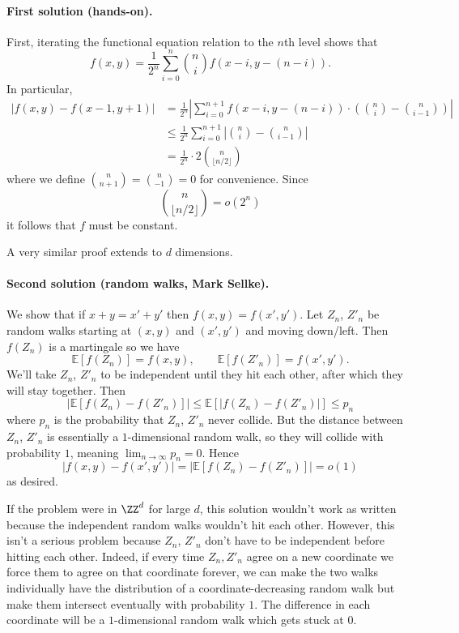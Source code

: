 \documentclass[11pt]{scrartcl}
\begin{document}
\paragraph{First solution (hands-on).}
First, iterating the functional equation
relation to the $n$th level shows that
\[ f(x, y) = \frac{1}{2^n} \sum_{i=0}^n \binom{n}{i} f(x-i, y-(n-i)). \]
In particular,
\begin{align*}
  |f(x, y) - f(x-1, y+1)|
  &= \frac{1}{2^n} \left\lvert \sum_{i=0}^{n+1} f(x-i, y-(n-i)) \cdot
  \left(\binom{n}{i} - \binom{n}{i-1} \right) \right\rvert \\
  &\le \frac{1}{2^n} \sum_{i=0}^{n+1} \left\lvert
    \binom{n}{i} - \binom{n}{i-1} \right\rvert \\
  &= \frac{1}{2^n} \cdot 2\binom{n}{\lfloor n/2 \rfloor}
\end{align*}
where we define $\binom{n}{n+1} = \binom{n}{-1} = 0$ for convenience.
Since \[ \binom{n}{\lfloor n/2 \rfloor} = o(2^n) \]
it follows that $f$ must be constant.

\begin{remark*}
A very similar proof extends to $d$ dimensions.
\end{remark*}

\paragraph{Second solution (random walks, Mark Sellke).}
We show that if $x+y=x'+y'$ then $f(x,y)=f(x',y')$.
Let $Z_n$, $Z'_n$ be random walks starting at $(x,y)$
and $(x',y')$ and moving down/left.
Then $f(Z_n)$ is a martingale so we have
\[\mathbb E[f(Z_n)]=f(x,y), \qquad
  \mathbb E[f(Z'_n)]=f(x',y') .\]
We'll take $Z_n$, $Z'_n$ to be independent until they hit each other,
after which they will stay together.  Then
\[|\mathbb E[f(Z_n)-f(Z'_n)]| \leq \mathbb E[|f(Z_n)-f(Z'_n)|]
  \leq p_n\]
where $p_n$ is the probability that $Z_n$, $Z'_n$ never collide.
But the distance between $Z_n$, $Z'_n$
is essentially a $1$-dimensional random walk,
so they will collide with probability $1$, meaning $\lim_{n\to\infty} p_n=0$.
Hence
\[ |f(x,y)-f(x',y')| = |\mathbb E[f(Z_n)-f(Z'_n)]| = o(1)\]
as desired.

\begin{remark*}
If the problem were in $\ZZ^d$ for large $d$,
this solution wouldn't work as written
because the independent random walks wouldn't hit each other.
However, this isn't a serious problem
because $Z_n$, $Z'_n$ don't have to be independent
before hitting each other.
Indeed, if every time $Z_n,Z'_n$ agree on a new coordinate
we force them to agree on that coordinate forever,
we can make the two walks individually have the distribution
of a coordinate-decreasing random walk but make them intersect
eventually with probability $1$.
The difference in each coordinate will be a $1$-dimensional
random walk which gets stuck at $0$.
\end{remark*}
\end{document}
